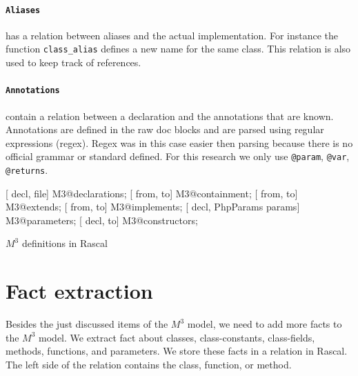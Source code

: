 \documentclass[../main.tex]{subfiles}
\begin{document}
    \paragraph{\texttt{Aliases}} has a relation between aliases and the actual implementation.
    For instance the function \texttt{class\_alias} defines a new name for the same class.
    This relation is also used to keep track of references. 
    
    \paragraph{\texttt{Annotations}} contain a relation between a declaration and the annotations that are known.
    Annotations are defined in the raw doc blocks and are parsed using regular expressions (regex).
    Regex was in this case easier then parsing because there is no official grammar or standard defined.
    For this research we only use \texttt{@param}, \texttt{@var}, \texttt{@returns}.
    \begin{program}    
    \begin{rascal}%
 [ decl,  file] M3@declarations;        
 [ from,  to] M3@containment;          
 [ from,  to] M3@extends;              
 [ from,  to] M3@implements;           
 [ decl, PhpParams params] M3@parameters; 
 [ decl,  to] M3@constructors;         
    \end{rascal}%
	
	\caption{$M^3$ definitions in Rascal}
	\label{fig:some_test}
	\end{program}
	    
    \section{Fact extraction}\label{sec:fact_extraction}
    Besides the just discussed items of the $M^3$ model, we need to add more facts to the $M^3$ model.
    We extract fact about classes, class-constants, class-fields, methods, functions, and parameters.
    We store these facts in a relation in Rascal.
    The left side of the relation contains the class, function, or method.
    \\
 
\end{document}
